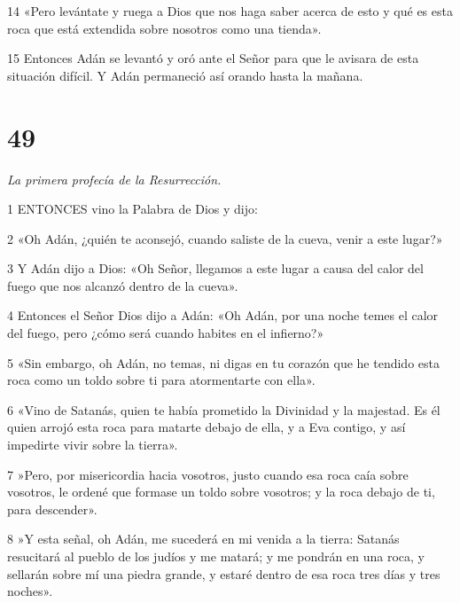\par 14 «Pero levántate y ruega a Dios que nos haga saber acerca de esto y qué es esta roca que está extendida sobre nosotros como una tienda».

\par 15 Entonces Adán se levantó y oró ante el Señor para que le avisara de esta situación difícil. Y Adán permaneció así orando hasta la mañana.

\chapter{49}

\par \textit{La primera profecía de la Resurrección.}

\par 1 ENTONCES vino la Palabra de Dios y dijo:

\par 2 «Oh Adán, ¿quién te aconsejó, cuando saliste de la cueva, venir a este lugar?»

\par 3 Y Adán dijo a Dios: «Oh Señor, llegamos a este lugar a causa del calor del fuego que nos alcanzó dentro de la cueva».

\par 4 Entonces el Señor Dios dijo a Adán: «Oh Adán, por una noche temes el calor del fuego, pero ¿cómo será cuando habites en el infierno?»

\par 5 «Sin embargo, oh Adán, no temas, ni digas en tu corazón que he tendido esta roca como un toldo sobre ti para atormentarte con ella».

\par 6 «Vino de Satanás, quien te había prometido la Divinidad y la majestad. Es él quien arrojó esta roca para matarte debajo de ella, y a Eva contigo, y así impedirte vivir sobre la tierra».

\par 7 »Pero, por misericordia hacia vosotros, justo cuando esa roca caía sobre vosotros, le ordené que formase un toldo sobre vosotros; y la roca debajo de ti, para descender».

\par 8 »Y esta señal, oh Adán, me sucederá en mi venida a la tierra: Satanás resucitará al pueblo de los judíos y me matará; y me pondrán en una roca, y sellarán sobre mí una piedra grande, y estaré dentro de esa roca tres días y tres noches».

